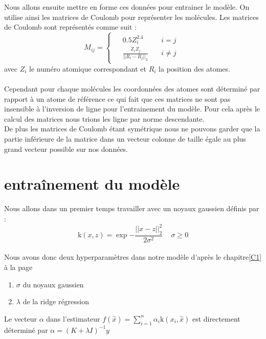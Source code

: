 \documentclass[a4paper,12pt,titlepage]{report}
\begin{document}
 \newpage
Nous allons ensuite mettre en forme ces données pour entrainer le modèle. On utilise ainsi les matrices de Coulomb pour représenter les molécules.
Les matrices de Coulomb sont représentés comme suit : 
\[
M_{ij} = 
	\left\{
	\begin{array}{ccc}		
	\begin{aligned}
		& 0.5 Z_{i}^{2.4} \quad &i=j\\
		& \frac{Z_i Z_j}{||R_i - R_j||_{2}} \quad &i\neq j
	\end{aligned}
\end{array}
	\right.
\]
avec $Z_i$ le numéro atomique correspondant et $R_i$ la position des atomes.\\
\paragraph{}
Cependant pour chaque molécules les coordonnées des atomes sont déterminé par rapport à un atome de référence ce qui fait que ces matrices ne sont pas insensible à l'inversion de ligne pour l'entrainement du modèle. Pour cela après le calcul des matrices nous trions les ligne par norme descendante.\\
De plus les matrices de Coulomb étant symétrique nous ne pouvons garder que la partie inférieure de la matrice dans un vecteur colonne de taille égale au plus grand vecteur possible sur nos données.

\section{entraînement du modèle}

Nous allons dans un premier temps travailler avec un noyaux gaussien définis par :
\[ 
	\text{k}(x,z) = \exp{- \frac{||x-z||_{2}^2}{2\sigma^2}} \, \quad \sigma \geqslant 0 
\]
\\
Nous avons donc deux hyperparamètres dans notre modèle d'après le chapitre\ref{C1} à la page \pageref{C1}
\begin{enumerate}
    \item $\sigma$ du noyaux gaussien
    \item $\lambda$ de la ridge régression
\end{enumerate}

Le vecteur $\alpha$ dans l'estimateur  $f(\overset{\sim}{x}) = \sum_{i = 1}^{n}{\alpha_i \text{k}(x_i , \overset{\sim}{x})}$ est directement déterminé
par $\alpha	=(K + \lambda I)^{-1}y$
\end{document}
